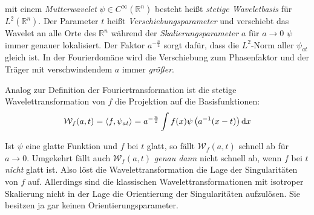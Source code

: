  mit einem \textit{Mutterwavelet} $\psi \in C^\infty (\mathbb{R}^n)$ besteht heißt \textit{stetige Waveletbasis} für $L^2(\mathbb{R}^n)$. Der Parameter $t$ heißt \textit{Verschiebungsparameter} und verschiebt das Wavelet an alle Orte des $\mathbb{R}^n$ während der \textit{Skalierungsparameter} $a$ für $a \to 0$ $\psi$ immer genauer lokalisiert. Der Faktor $a^{-\frac{n}{2}}$ sorgt dafür, dass die $L^2$-Norm aller $\psi_{at}$ gleich ist. In der Fourierdomäne wird die Verschiebung zum Phasenfaktor und der Träger mit verschwindendem $a$ immer \emph{größer}.



Analog zur Definition der Fouriertransformation ist die stetige Wavelettransformation von $f$ die Projektion auf die Basisfunktionen:
\begin{equation}
    \mathcal{W}_f (a,t) = \left\langle f, \psi_{at} \right\rangle
    = a^{-\frac{n}{2}} \int f(x) \psi \left(a^{-1}(x-t)\right) \mathop{}\!\mathrm{d} x
\end{equation}

Ist $\psi$ eine glatte Funktion und $f$ bei $t$ glatt, so fällt $\mathcal{W}_f (a,t)$ schnell ab für $a \to 0$.
Umgekehrt fällt auch $\mathcal{W}_f(a,t)$ \emph{genau dann} nicht schnell ab, wenn $f$ bei $t$ \emph{nicht} glatt ist. Also löst die Wavelettransformation die Lage der Singularitäten von $f$ auf. Allerdings sind die klassischen  Wavelettransformationen mit isotroper Skalierung nicht in der Lage die  Orientierung der Singularitäten aufzulösen. Sie besitzen ja gar keinen Orientierungsparameter.


